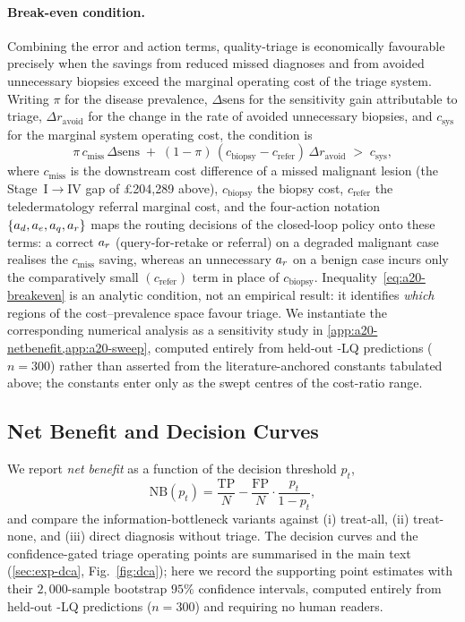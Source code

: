 \paragraph{Break-even condition.}
Combining the error and action terms, quality-triage is economically favourable precisely when the
savings from reduced missed diagnoses and from avoided unnecessary biopsies exceed the marginal
operating cost of the triage system. Writing $\pi$ for the disease prevalence, $\Delta\mathrm{sens}$ for
the sensitivity gain attributable to triage, $\Delta r_{\mathrm{avoid}}$ for the change in the rate of
avoided unnecessary biopsies, and $c_{\mathrm{sys}}$ for the marginal system operating cost, the
condition is
\begin{equation}
\pi\,c_{\mathrm{miss}}\,\Delta\mathrm{sens}
\;+\;
(1-\pi)\,(c_{\mathrm{biopsy}}-c_{\mathrm{refer}})\,\Delta r_{\mathrm{avoid}}
\;>\;
c_{\mathrm{sys}},
\label{eq:a20-breakeven}
\end{equation}
where $c_{\mathrm{miss}}$ is the downstream cost difference of a missed malignant lesion (the
Stage~I$\to$IV gap of \pounds204{,}289 above), $c_{\mathrm{biopsy}}$ the biopsy cost, $c_{\mathrm{refer}}$
the teledermatology referral marginal cost, and the four-action notation
$\{a_d,a_e,a_q,a_r\}$ maps the routing decisions of the closed-loop policy onto these terms: a
correct $a_r$ (query-for-retake or referral) on a degraded malignant case realises the
$c_{\mathrm{miss}}$ saving, whereas an unnecessary $a_r$ on a benign case incurs only the
comparatively small $(c_{\mathrm{refer}})$ term in place of $c_{\mathrm{biopsy}}$.
Inequality~\eqref{eq:a20-breakeven} is an analytic condition, not an empirical result: it identifies
\emph{which} regions of the cost--prevalence space favour triage. We instantiate the corresponding
numerical analysis as a sensitivity study in \cref{app:a20-netbenefit,app:a20-sweep}, computed entirely
from held-out \itb{}-LQ predictions ($n=300$) rather than asserted from the literature-anchored
constants tabulated above; the constants enter only as the swept centres of the cost-ratio range.

\subsection{Net Benefit and Decision Curves}\label{app:a20-netbenefit}
We report \emph{net benefit} as a function of the decision threshold $p_t$,
\begin{equation}
\mathrm{NB}(p_t) = \frac{\mathrm{TP}}{N} - \frac{\mathrm{FP}}{N}\cdot\frac{p_t}{1-p_t},
\label{eq:a20-nb}
\end{equation}
and compare the information-bottleneck variants against (i) treat-all, (ii) treat-none, and (iii)
direct diagnosis without triage. The decision curves and the confidence-gated triage operating points
are summarised in the main text (\cref{sec:exp-dca}, Fig.~\ref{fig:dca}); here we record the supporting
point estimates with their $2{,}000$-sample bootstrap $95\%$ confidence intervals, computed entirely
from held-out \itb{}-LQ predictions ($n=300$) and requiring no human readers.

